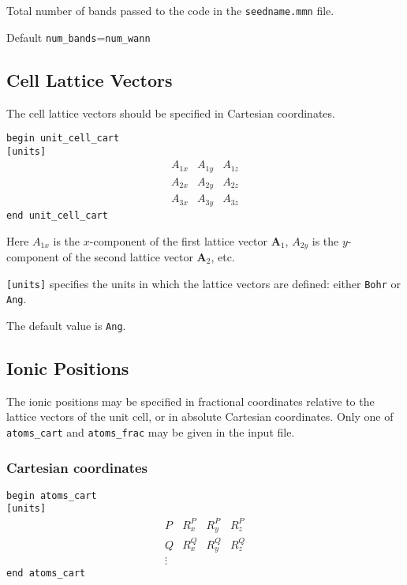 Total number of bands passed to the code in the {\tt seedname.mmn} file.

Default \verb#num_bands#=\verb#num_wann#

\subsection[Cell Lattice Vectors]{Cell Lattice Vectors}

The cell lattice vectors should be specified in Cartesian coordinates.


\noindent \verb#begin unit_cell_cart# \\
\verb#[units]#
$$
\begin{array}{ccc}
A_{1x} & A_{1y} & A_{1z} \\
A_{2x} & A_{2y} & A_{2z} \\
A_{3x} & A_{3y} & A_{3z}
\end{array}
$$
\verb#end unit_cell_cart#

Here $A_{1x}$ is the $x$-component of the first lattice vector $\mathbf{A}_1$,
$A_{2y}$ is the $y$-component of the second lattice vector $\mathbf{A}_2$, etc.

\verb#[units]# specifies the units in which the lattice vectors are
defined: either \verb#Bohr# or \verb#Ang#. 

The default value is \verb#Ang#.



\subsection[Ionic Positions]{Ionic Positions}

The ionic positions may be specified in fractional coordinates relative
to the lattice vectors of the unit cell, or in absolute Cartesian coordinates.
Only one of \verb#atoms_cart# and \verb#atoms_frac# may be given in the input
file.


\subsubsection{Cartesian coordinates}

\noindent \verb#begin atoms_cart# \\
\verb#[units]#
$$
\begin{array}{cccc}
P  & R^{P}_{x} & R^{P}_{y} & R^{P}_{z} \\
Q  & R^{Q}_{x} & R^{Q}_{y} & R^{Q}_{z} \\
\vdots
\end{array}
$$
\verb#end atoms_cart#


